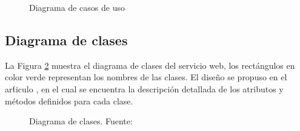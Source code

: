 \begin{figure}[!ht]
	\centering
    \caption{Diagrama de casos de uso} %
    \label{casoUso1}
\end{figure}

\subsection{Diagrama de clases}

La Figura \ref{diagramaClases1} muestra el diagrama de clases del servicio web, los rect\'angulos en color verde representan los nombres de las clases. El dise\~{n}o se propuso en el ar\'ticulo \cite{SOMIdiseno}, en el cual se encuentra la descripci\'on detallada de los atributos y m\'etodos definidos para cada clase.

\begin{figure}[!ht]
	\centering
    \caption{Diagrama de clases. Fuente: \cite{SOMIdiseno}} %
    \label{diagramaClases1}
\end{figure}

